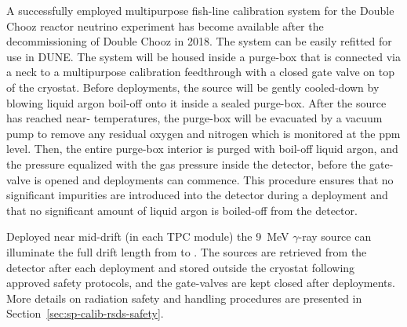 A successfully employed multipurpose fish-line calibration
system
for the Double Chooz reactor neutrino experiment has become available 
after the decommissioning of Double Chooz in 2018. The system can be easily refitted for use in DUNE. The system will be housed inside a purge-box that is connected via a neck to a multipurpose calibration feedthrough with a closed gate valve on top of the cryostat. Before deployments, the source will be gently cooled-down by blowing liquid argon boil-off onto it inside a sealed purge-box. After the source has reached 
near- temperatures, the purge-box will be evacuated by a vacuum pump to remove any residual oxygen and nitrogen which is monitored at the ppm level. Then, the entire purge-box interior is purged with boil-off liquid argon, and the pressure equalized with the gas pressure inside the detector, before the gate-valve is opened and deployments can commence. This procedure ensures that no significant impurities are introduced into the detector during a deployment and that no significant amount of liquid argon is boiled-off from the detector. 

Deployed near mid-drift (in each TPC module) the \SI{9}{\MeV} $\gamma$-ray source can illuminate the full drift length from  to . The sources are retrieved from the detector after each deployment and stored outside the cryostat following approved safety protocols, and the gate-valves are kept closed after deployments. More details on radiation safety and handling procedures are presented in Section~\ref{sec:sp-calib-rsds-safety}.

